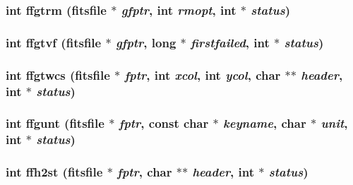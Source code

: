 \subsubsection{\setlength{\rightskip}{0pt plus 5cm}int ffgtrm (\bf{fitsfile} $\ast$ {\em gfptr}, int {\em rmopt}, int $\ast$ {\em status})}\label{fitsio__64_8h_8eb856e08aa6132af39ea5367b9f3d84}


\subsubsection{\setlength{\rightskip}{0pt plus 5cm}int ffgtvf (\bf{fitsfile} $\ast$ {\em gfptr}, long $\ast$ {\em firstfailed}, int $\ast$ {\em status})}\label{fitsio__64_8h_62614e8f30dfc3b69da9082d255df146}


\subsubsection{\setlength{\rightskip}{0pt plus 5cm}int ffgtwcs (\bf{fitsfile} $\ast$ {\em fptr}, int {\em xcol}, int {\em ycol}, char $\ast$$\ast$ {\em header}, int $\ast$ {\em status})}\label{fitsio__64_8h_8aebd57fb3bdfea239f253d351428280}


\subsubsection{\setlength{\rightskip}{0pt plus 5cm}int ffgunt (\bf{fitsfile} $\ast$ {\em fptr}, const char $\ast$ {\em keyname}, char $\ast$ {\em unit}, int $\ast$ {\em status})}\label{fitsio__64_8h_3ded4758cbd229441eb87d0db121198f}


\subsubsection{\setlength{\rightskip}{0pt plus 5cm}int ffh2st (\bf{fitsfile} $\ast$ {\em fptr}, char $\ast$$\ast$ {\em header}, int $\ast$ {\em status})}\label{fitsio__64_8h_00930d127a2fe18c8822c389b64da8c2}



